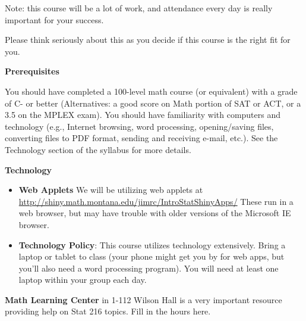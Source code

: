 Note: this course will be a lot of work, and attendance every day is
really important for your success. 

Please think seriously about this as you decide if this course is the
right fit for you.    

\newpage
 
{\bf Prerequisites }
 
You should have completed  a 100-level math course (or equivalent) with
a grade of C- or better (Alternatives: a good score on Math portion
of SAT or ACT, or a 3.5 on the MPLEX exam).   
 You should have familiarity with computers and technology (e.g.,
Internet browsing, word processing, opening/saving files, converting
files to PDF format, sending and receiving e-mail, etc.). See the
Technology section of the syllabus for more details.  
 


{\bf Technology} 
\begin{itemize}
\item {\bf Web Applets}  We will be utilizing web applets 
 at \url{http://shiny.math.montana.edu/jimrc/IntroStatShinyApps/}
  These run in a web browser, but
  may have trouble with older versions of the Microsoft IE browser.
\item {\bf Technology Policy}:  This course utilizes technology
  extensively.  Bring a laptop or tablet to class (your phone might
  get you by for web apps, but you'll also need a word processing
  program).  You will need at least one laptop within your group each
  day.
\end{itemize}

{\bf Math Learning Center} in 1-112 Wilson Hall is a very important
resource providing  help on Stat 216 topics.
  Fill in the hours here. \vspace{1in}


